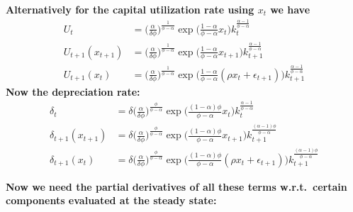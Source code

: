 \documentclass[a4paper]{article}
\theoremstyle{definition}
\begin{document}
\textbf{Alternatively for the capital utilization rate using $x_t$ we have}
	\begin{align*}
	U_t 					&= \Big( \frac{\alpha}{\delta\phi} \Big)^{\frac{1}{\phi-\alpha}} \exp\Big(\frac{1-\alpha}{\phi-\alpha}x_t\Big)k_{t}^{\frac{\alpha-1}{\phi-\alpha}} \\
	U_{t+1}(x_{t+1})	&= \Big( \frac{\alpha}{\delta\phi} \Big)^{\frac{1}{\phi-\alpha}} \exp\Big(\frac{1-\alpha}{\phi-\alpha}x_{t+1}\Big)k_{t+1}^{\frac{\alpha-1}{\phi-\alpha}} \\
	U_{t+1}(x_t)			&=  \Big( \frac{\alpha}{\delta\phi} \Big)^{\frac{1}{\phi-\alpha}} \exp\Big(\frac{1-\alpha}{\phi-\alpha}(\rho x_t + \epsilon_{t+1})\Big)k_{t+1}^{\frac{\alpha-1}{\phi-\alpha}}
	\end{align*}
\textbf{Now the depreciation rate:}
	\begin{align*}
	\delta_t 						&= \delta \Big( \frac{\alpha}{\delta\phi} \Big)^{\frac{\phi}{\phi-\alpha}} \exp\Big(\frac{(1-\alpha)\phi}{\phi-\alpha}x_t\Big)k_{t}^{\frac{\alpha-1}{\phi-\alpha}} \\
	\delta_{t+1}(x_{t+1})		&= \delta \Big( \frac{\alpha}{\delta\phi} \Big)^{\frac{\phi}{\phi-\alpha}} \exp\Big(\frac{(1-\alpha)\phi}{\phi-\alpha}x_{t+1}\Big)k_{t+1}^{\frac{(\alpha-1)\phi}{\phi-\alpha}} \\
	\delta_{t+1}(x_t)			&=  \delta \Big( \frac{\alpha}{\delta\phi} \Big)^{\frac{\phi}{\phi-\alpha}} \exp\Big(\frac{(1-\alpha)\phi}{\phi-\alpha}(\rho x_t + \epsilon_{t+1})\Big)k_{t+1}^{\frac{(\alpha-1)\phi}{\phi-\alpha}}	
	\end{align*}	
	
	
	
	
	
	
	
	
	
			
\textbf{Now we need the partial derivatives of all these terms w.r.t.\ certain components evaluated at the steady state:}
\end{document}
